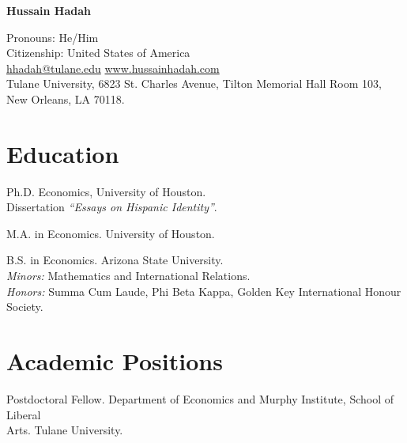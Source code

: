 \documentclass[letterpaper]{article}
\def\name{Hussain Hadah}
\renewenvironment{itemize}{
  \begin{list}{}{
    \setlength{\leftmargin}{1.5em}
  }
}{
  \end{list}
}
\begin{document}
\centerline{\huge \bf \name}

\begin{center}
   \hspace{0.5mm} Pronouns: He/Him \href{https://www.mypronouns.org/}{\faQuestionCircleO}  
\\    
\hspace{0.5mm} Citizenship: United States of America
\\
\faEnvelopeO \hspace{0.5mm} \href{mailto:hhadah@tulane.edu}{hhadah@tulane.edu} \rm  \hspace{0.5mm} \faGlobe \hspace{0.5mm} \href{https://www.hussainhadah.com/}{www.hussainhadah.com} 
\href{https://www.linkedin.com/in/hussain-hadah/}{\faLinkedinSquare} \href{https://github.com/hhadah}{\faGithub} 
\\ Tulane University, 6823 St. Charles Avenue, Tilton Memorial Hall Room 103, New Orleans, LA 70118.\\
  
\end{center}


\section*{Education}
\vspace{2 mm}
\begin{itemize}
  \item {}Ph.D. Economics, University of Houston. \\{\makebox[1.8cm]{\hfill}}Dissertation \textit{“Essays on Hispanic Identity”}.
  \item {}M.A. in Economics. University of Houston. 
  \item {}B.S. in Economics.  Arizona State University. \\{\makebox[1.8cm]{\hfill}}\textit{Minors:} Mathematics and International Relations. \\{\makebox[1.8cm]{\hfill}}\textit{Honors:} Summa Cum Laude, Phi Beta Kappa, Golden Key International Honour Society.
\end{itemize}
\vspace{2 mm}

\section*{Academic Positions}
\vspace{2 mm}
\begin{itemize}
  \item {} Postdoctoral Fellow. Department of Economics and Murphy Institute, School of Liberal \\{\makebox[1.8cm]{\hfill}}Arts. Tulane University.
\end{itemize}
\vspace{2 mm}
\end{document}
